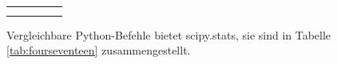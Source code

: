 \begin{table}[H]
{\begin{tabular}{| c | c | c | c | c |}
\parbox[c][0.5in][c]{1.3in}{\centering{}\selectfont{Rayleigh-
Verteilung}} & 
\parbox[c][0.5in][c]{1.1in}{\centering{}\selectfont{raylpdf(x,b)}} &
\parbox[c][0.5in][c]{1.1in}{\centering{}\selectfont{raylcdf(x,b)}} & 
\parbox[c][0.5in][c]{1.1in}{\centering{}\selectfont{raylinv(P,b)}}  & 
\parbox[c][0.5in][c]{1.4in}{\centering{}\selectfont{raylrnd(b)}} \\
\hline

\parbox[c][0.5in][c]{1.3in}{\centering{}\selectfont{Normalverteilung}} & 
\parbox[c][0.5in][c]{1.1in}{\centering{}\selectfont{normpdf(x,$\mu$,$\sigma$)}} &
\parbox[c][0.5in][c]{1.1in}{\centering{}\selectfont{normcdf(x,$\mu$,$\sigma$)}} & 
\parbox[c][0.5in][c]{1.1in}{\centering{}\selectfont{norminv(P,$\mu$,$\sigma$)}}  & 
\parbox[c][0.5in][c]{1.4in}{\centering{}\selectfont{normrnd($\mu$,$\sigma$)}} \\
\hline

\parbox[c][0.5in][c]{1.3in}{\centering{}\selectfont{Logarithmische 
Normalverteilung}} & 
\parbox[c][0.5in][c]{1.1in}{\centering{}\selectfont{lognpdf(x,$\mu$,$\sigma$)}} &
\parbox[c][0.5in][c]{1.1in}{\centering{}\selectfont{logncdf(x,$\mu$,$\sigma$)}} & 
\parbox[c][0.5in][c]{1.1in}{\centering{}\selectfont{loginv(P,$\mu$,$\sigma$)}}  & 
\parbox[c][0.5in][c]{1.4in}{\centering{}\selectfont{lognrnd($\mu$,$\sigma$)}} \\
\hline

\end{tabular}%
}
\label{tab:foursixteen}
\end{table}

\noindent Vergleichbare Python-Befehle bietet scipy.stats, sie sind in Tabelle \ref{tab:fourseventeen} zusammengestellt.

